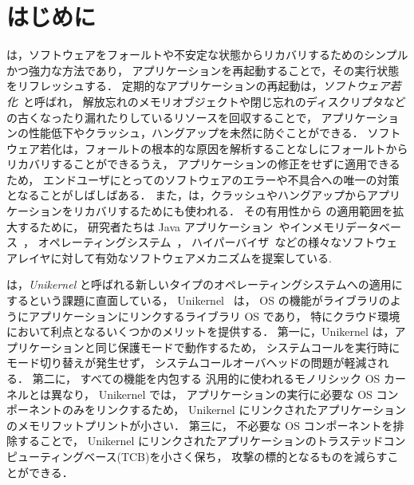 \section{はじめに} \label{section:introduction}

\rr は，ソフトウェアをフォールトや不安定な状態からリカバリするためのシンプルかつ強力な方法であり，
アプリケーションを再起動することで，その実行状態をリフレッシュする．
定期的なアプリケーションの再起動は，\emph{ソフトウェア若化}~\cite{HuangEtAl-rejuvenation,CotroneoEtAl-rejuvenation-survey,CotroneoEtAl-Surv14}と呼ばれ，
解放忘れのメモリオブジェクトや閉じ忘れのディスクリプタなどの古くなったり漏れたりしているリソースを回収することで，
アプリケーションの性能低下やクラッシュ，ハングアップを未然に防ぐことができる．
ソフトウェア若化は，フォールトの根本的な原因を解析することなしにフォールトからリカバリすることができるうえ，
アプリケーションの修正をせずに適用できるため，
エンドユーザにとってのソフトウェアのエラーや不具合への唯一の対策となることがしばしばある．
また，\rr は，クラッシュやハングアップからアプリケーションをリカバリするためにも使われる．
その有用性から \rr の適用範囲を拡大するために，
研究者たちは Java アプリケーション~\cite{CandeaEtAl-Microreboot}やインメモリデータベース~\cite{JumonjiEtAl-WoSAR17,JumonjiEtAl-IEICE2021}，
オペレーティングシステム~\cite{YamakitaEtAl-PBR,DepoutovitchEtAl-otherworld,KouraiEtAl-cachemind,TeradaEtAl-Dwarf,BovenziEtAl-ISSRE13}，
ハイパーバイザ~\cite{KouraiEtAl-Roothammer,KouraiEtAl-TDSC,LeEtAl-VEE11}などの様々なソフトウェアレイヤに対して有効なソフトウェアメカニズムを提案している.

\rr は，\emph{Unikernel} と呼ばれる新しいタイプのオペレーティングシステムへの適用にするという課題に直面している，
Unikernel ~\cite{MadhavapeddyEtAl-Unikernel,KivityEtAl-OSv,SartakovEtAl-ASPLOS21,KanteeEtAl-rumprun,KuenzerEtAl-Unikraft}は，
OS の機能がライブラリのようにアプリケーションにリンクするライブラリ OS であり，
特にクラウド環境において利点となるいくつかのメリットを提供する．
第一に，Unikernel は，アプリケーションと同じ保護モードで動作するため，
システムコールを実行時にモード切り替えが発生せず，
システムコールオーバヘッドの問題が軽減される．
第二に，
すべての機能を内包する
汎用的に使われるモノリシック OS カーネルとは異なり，
Unikernel では，
アプリケーションの実行に必要な OS コンポーネントのみをリンクするため，
Unikernel にリンクされたアプリケーションのメモリフットプリントが小さい．
第三に，
不必要な OS コンポーネントを排除することで，
Unikernel にリンクされたアプリケーションのトラステッドコンピューティングベース(TCB)を小さく保ち，
攻撃の標的となるものを減らすことができる．

